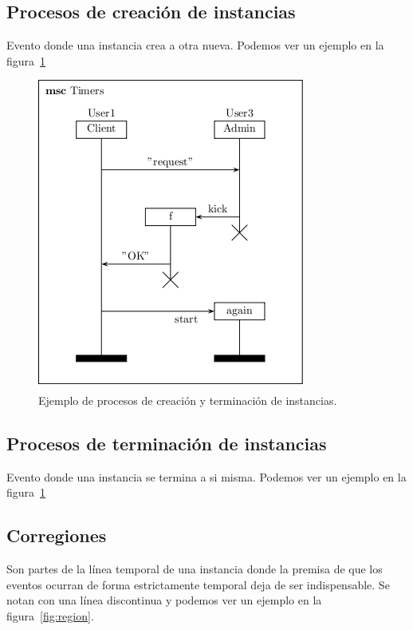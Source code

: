 \subsection*{Procesos de creación de instancias} 
Evento donde una instancia crea a otra nueva. Podemos ver un ejemplo
en la figura~\ref{fig:instanceprocess}
\begin{figure}
  \centering
  \includegraphics[scale=1]{./images/instanceprocess.png}
  \caption{Ejemplo de procesos de creación y terminación de instancias.}
  \label{fig:instanceprocess}
\end{figure}
\subsection*{Procesos de terminación de instancias}
Evento donde una instancia se termina a si misma. Podemos ver un ejemplo
en la figura~\ref{fig:instanceprocess}
\subsection*{Corregiones}
Son partes de la línea temporal de una instancia donde la premisa de
que los eventos ocurran de forma estrictamente temporal deja de ser
indispensable. Se notan con una línea discontinua y podemos ver un
ejemplo en la figura~\ref{fig:region}.

